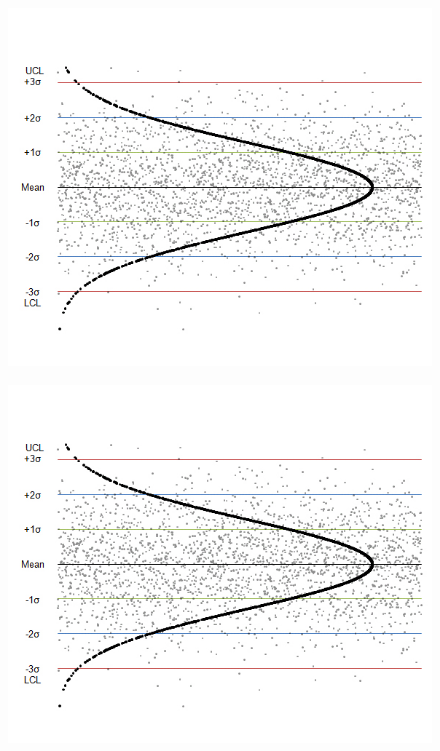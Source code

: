 \documentclass{beamer}
\begin{document}
\begin{frame}
	
\begin{figure}
\centering
\includegraphics[width=1.0\linewidth]{images/ControlChart}
\end{figure}
	
\end{frame}
\begin{frame}
	
	\begin{figure}
		\centering
		\includegraphics[width=1.0\linewidth]{images/ControlChart}
	\end{figure}
	
\end{frame}
\end{document}
